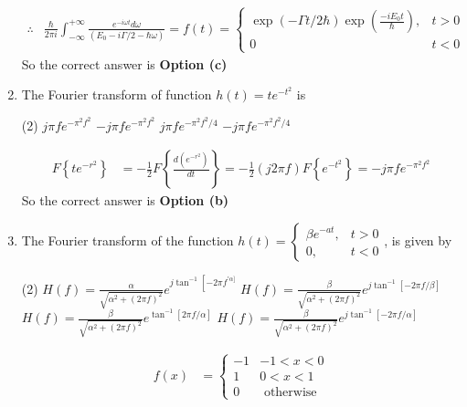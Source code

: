 \begin{enumerate}
\begin{answer}
\begin{align*}
	\therefore &\frac{\hbar}{2 \pi i} \int_{-\infty}^{+\infty} \frac{e^{-i \omega t} d \omega}{\left(E_{0}-i \Gamma / 2-\hbar \omega\right)}=f(t)= \begin{cases}\exp (-\Gamma t / 2 \hbar) \exp \left(\frac{-i E_{0} t}{\hbar}\right), & t>0 \\ 0 & t<0\end{cases}
	\end{align*}
	So the correct answer is \textbf{Option (c)}
\end{answer}
	\item The Fourier transform of function $h(t)=t e^{-t^{2}}$ is 
	\begin{tasks}(2)
		\task[\textbf{a.}] $j \pi f e^{-\pi^{2} f^{2}}$
		\task[\textbf{b.}]$-j \pi f e^{-\pi^{2} f^{2}}$
		\task[\textbf{c.}]$j \pi f e^{-\pi^{2} f^{2} / 4}$
		\task[\textbf{d.}] $-j \pi f e^{-\pi^{2} f^{2} / 4}$
	\end{tasks}
	\begin{answer}
	\begin{align*}
	F\left\{t e^{-r^{2}}\right\}&=-\frac{1}{2} F\left\{\frac{d\left(e^{-r^{2}}\right)}{d t}\right\}=-\frac{1}{2}(j 2 \pi f) F\left\{e^{-t^{2}}\right\}=-j \pi f e^{-\pi^{2} f^{2}}
	\end{align*}
	So the correct answer is \textbf{Option (b)}
\end{answer}
	\item The Fourier transform of the function $h(t)=\left\{\begin{array}{cc}\beta e^{-a t}, & t>0 \\ 0, & t<0\end{array}\right.$, is given by
	\begin{tasks}(2)
		\task[\textbf{a.}]$H(f)=\frac{\alpha}{\sqrt{\alpha^{2}+(2 \pi f)^{2}}} e^{j \tan ^{-1}\left[-2 \pi f^{\prime \alpha]}\right.}$
		\task[\textbf{b.}]$H(f)=\frac{\beta}{\sqrt{\alpha^{2}+(2 \pi f)^{2}}} e^{j \tan ^{-1}[-2 \pi f / \beta]}$
		\task[\textbf{c.}]$H(f)=\frac{\beta}{\sqrt{\alpha^{2}+(2 \pi f)^{2}}} e^{\tan ^{-1}[2 \pi f / \alpha]}$
		\task[\textbf{d.}] $H(f)=\frac{\beta}{\sqrt{\alpha^{2}+(2 \pi f)^{2}}} e^{j \tan ^{-1}[-2 \pi f / \alpha]}$
	\end{tasks}
	\begin{answer}
	\begin{align*}
	f(x)&=\left\{\begin{array}{rl}-1 & -1<x<0 \\ 1 & 0<x<1 \\ 0 & \text { otherwise }\end{array}\right.\\

\end{align*}
\end{answer}
\end{enumerate}
